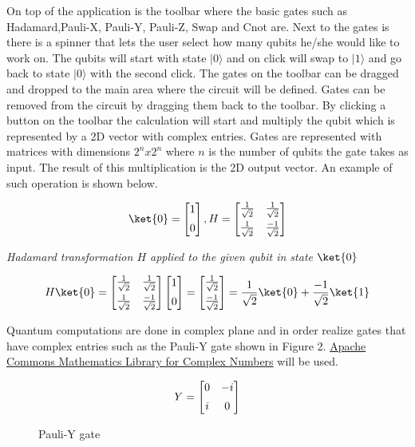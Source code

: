 \documentclass[12pt]{article}
\begin{document}
			On top of the application is the toolbar where the basic gates such as Hadamard,Pauli-X,
 Pauli-Y, Pauli-Z, Swap and Cnot are. Next to the gates is there is a spinner that lets 
 the user select how many qubits he/she would like to work on. The qubits will start with 
 state   $\vert 0  \rangle$  and on click will swap to  $\vert 1 \rangle$ and go back to 
 state  $\vert 0 \rangle$  with the second click. The gates on the toolbar can be dragged 
 and dropped to the main area where the circuit will be defined. Gates can be removed from 
 the circuit by dragging them back to the toolbar. By clicking a button on the toolbar the 
 calculation will start and multiply the qubit which is represented by a 2D vector with 
 complex entries. Gates are represented with matrices with dimensions $2^n x 2^n$ where $n$ is the number of 
	qubits the gate takes as input. The result of this multiplication is the 2D output vector. An example of such operation is
 shown below.

$$
\ket{0} =   
 \begin{bmatrix} 
 1 \\[5pt] 
 0
 \end{bmatrix}, H =
\begin{bmatrix} 
 \frac{1}{\sqrt{2}} &  \frac{1}{\sqrt{2}} \\[5pt] 
 \frac{1}{\sqrt{2}} &  \frac{-1}{\sqrt{2}}
 \end{bmatrix}\\[5pt]
$$

\begin{center}
\textit{Hadamard transformation $H$ applied to the given qubit in state $\ket{0}$}
\end{center}
$$
\\[5pt]
H\ket{0} =
\begin{bmatrix} 
 \frac{1}{\sqrt{2}} &  \frac{1}{\sqrt{2}} \\[5pt]  
 \frac{1}{\sqrt{2}} &  \frac{-1}{\sqrt{2}}
 \end{bmatrix}
\begin{bmatrix} 
 1 \\[5pt] 
 0
 \end{bmatrix}
= \begin{bmatrix} 
  \frac{1}{\sqrt{2}} \\[5pt] 
  \frac{-1}{\sqrt{2}}
 \end{bmatrix}
=\frac{1}{\sqrt{2}} \ket{0} +  \frac{-1}{\sqrt{2}}\ket{1}
$$

Quantum computations are done in complex plane and in order realize 
gates that have complex entries such as the Pauli-Y gate shown in Figure 2.
\href{commons.apache.org/proper/commons-math/userguide/complex.html}{Apache Commons Mathematics Library for Complex Numbers}
 will be used.
\begin{figure}[h]
$$ Y =
\begin{bmatrix} 
 0 &  -i \\[5pt] 
 i &  0
 \end{bmatrix}\\[5pt]
$$
\begin{center}
\caption{Pauli-Y gate}
\end{center}
\end{figure}\\
\end{document}
